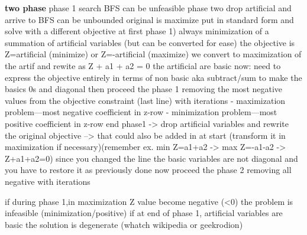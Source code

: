 \documentclass[11pt]{article}
\begin{document}
\textbf{two phase} phase 1 search BFS can be unfeasible phase two drop artificial and arrive to BFS can be unbounded
original is maximize put in standard form and solve with a different objective at first
phase 1) always minimization of a summation of artificial variables (but can be converted for ease)
the objective is Z=\sum artificial (minimize)       or      Z=\sum -artificial (maximize)      
we convert to maximization of the artif and rewite as Z + a1 + a2 = 0
the artificial are basic now: need to express the objective entirely in terms of non basic aka subtract/sum to make the basics 0s and diagonal 
then proceed the phase 1 removing the most negative values from the objective constraint (last line) with iterations
    - maximization problem—most negative coefficient in z-row
    - minimization problem—most positive coefficient in z-row
end phase1 -> drop artificial variables and rewrite the original objective --> that could also be added in at start
                (transform it in maximization if necessary)(remember ex. min Z=a1+a2 -> max Z=-a1-a2 -> Z+a1+a2=0)
since you changed the line the basic variables are not diagonal and you have to restore it as previously done
now proceed the phase 2 removing all negative with iterations 

if during phase 1,in maximization Z value become negative (<0) the problem is infeasible (minimization/positive)
if at end of phase 1, artificial variables are basic the solution is degenerate (whatch wikipedia or geekrodion)
\end{document}
